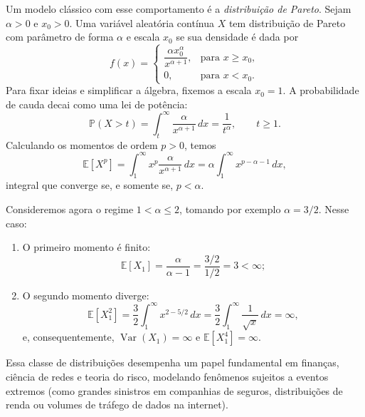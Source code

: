 \documentclass[12pt,portuguese]{article}
\theoremstyle{definition}
\theoremstyle{plainexercise}
\theoremstyle{starredexercise}
\theoremstyle{definition}
\begin{document}
Um modelo clássico com esse comportamento é a \emph{distribuição de Pareto}.
Sejam $\alpha>0$ e $x_0>0$. Uma variável aleatória contínua $X$ tem distribuição
de Pareto com parâmetro de forma $\alpha$ e escala $x_0$ se sua densidade é dada
por
\begin{equation}\label{eq:densidade-pareto}
f(x)=
\begin{cases}
\dfrac{\alpha x_0^\alpha}{x^{\alpha+1}}, & \text{para } x\geqslant x_0,\\[6pt]
0, & \text{para } x<x_0.
\end{cases}
\end{equation}
Para fixar ideias e simplificar a álgebra, fixemos a escala $x_0=1$. A
probabilidade de cauda decai como uma lei de potência:
\[
\mathbb{P}(X>t)=\int_t^{\infty}\frac{\alpha}{x^{\alpha+1}}\,dx=\frac{1}{t^\alpha},
\qquad t\geqslant1.
\]
Calculando os momentos de ordem $p>0$, temos
\[
\mathbb{E}[X^p]=\int_1^{\infty}x^p\frac{\alpha}{x^{\alpha+1}}\,dx
=\alpha\int_1^{\infty}x^{p-\alpha-1}\,dx,
\]
integral que converge se, e somente se, $p<\alpha$.

Consideremos agora o regime $1<\alpha\leqslant2$, tomando por exemplo
$\alpha=3/2$. Nesse caso:
\begin{enumerate}
\item[(i)] O primeiro momento é finito:
\[
\mathbb{E}[X_1]=\frac{\alpha}{\alpha-1}=\frac{3/2}{1/2}=3<\infty;
\]
\item[(ii)] O segundo momento diverge:
\[
\mathbb{E}[X_1^2]=\frac{3}{2}\int_1^{\infty}x^{2-5/2}\,dx
=\frac{3}{2}\int_1^{\infty}\frac{1}{\sqrt{x}}\,dx=\infty,
\]
e, consequentemente, $\operatorname{Var}(X_1)=\infty$ e $\mathbb{E}[X_1^4]=\infty$.
\end{enumerate}

Essa classe de distribuições desempenha um papel fundamental em finanças,
ciência de redes e teoria do risco, modelando fenômenos sujeitos a eventos
extremos (como grandes sinistros em companhias de seguros, distribuições de renda
ou volumes de tráfego de dados na internet).
\end{document}

